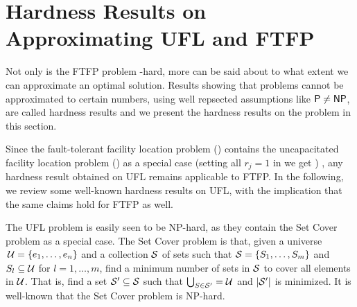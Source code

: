 \documentclass[oneside,final]{ucr}
\begin{document}
\section{Hardness Results on Approximating UFL and FTFP}
\label{sec:hardness}

Not only is the FTFP problem \NP-hard, more can be said
about to what extent we can approximate an optimal
solution. Results showing that problems cannot be
approximated to certain numbers, using well repsected
assumptions like ${\mbox{\sf P}}\neq {\mbox{\sf NP}}$, are called hardness results
and we present the hardness results on the {\FTFP} problem
in this section.

Since the fault-tolerant facility location problem (\FTFP)
contains the uncapacitated facility location problem (\UFL)
as a special case (setting all $r_j=1$ in {\FTFP} we get
{\UFL}) , any hardness result obtained on UFL remains
applicable to FTFP. In the following, we review some
well-known hardness results on UFL, with the implication
that the same claims hold for FTFP as well.

The UFL problem is easily seen to be NP-hard, as they
contain the Set Cover problem as a special case. The Set
Cover problem is that, given a universe $\,\calU = \{e_1,
\ldots, e_n\}$ and a collection $\calS$ of sets such that
$\calS = \{S_1, \ldots, S_m\}$ and $S_l \subseteq \calU$ for
$l=1,\ldots,m$, find a minimum number of sets in $\calS$ to
cover all elements in $\calU$. That is, find a set $\calS'
\subseteq \calS$ such that $\bigcup_{S\in \calS'} = \calU$
and $|\calS'|$ is minimized. It is well-known that the
Set Cover problem is NP-hard.
\end{document}
